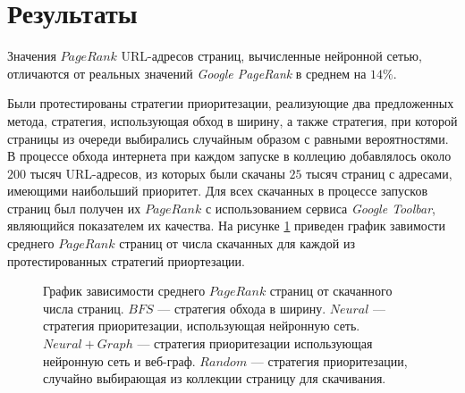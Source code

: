 \section{Результаты}

Значения $PageRank$ URL-адресов страниц, вычисленные нейронной сетью, отличаются от реальных значений \textit{Google PageRank} в среднем на $14\%$.

Были протестированы стратегии приоритезации, реализующие два предложенных метода, стратегия, использующая обход в ширину, а также стратегия, при которой страницы из очереди выбирались случайным образом с равными вероятностями. В процессе обхода интернета при каждом запуске в коллецию добавлялось около $200$ тысяч URL-адресов, из которых были скачаны $25$ тысяч страниц с адресами, имеющими наибольший приоритет. Для всех скачанных в процессе запусков страниц был получен их $PageRank$ с использованием сервиса \textit{Google Toolbar}, являющийся показателем их качества. На рисунке \ref{graphic} приведен график завимости среднего $PageRank$ страниц от числа скачанных для каждой из протестированных стратегий приортезации.

\begin{figure}[h!]
\caption{График зависимости среднего $PageRank$ страниц от скачанного числа страниц. $BFS$ --- стратегия обхода в ширину. $Neural$ --- стратегия приоритезации, использующая нейронную сеть. $Neural + Graph$ --- стратегия приоритезации использующая нейронную сеть и веб-граф. $Random$ --- стратегия приоритезации, случайно выбирающая из коллекции страницу для скачивания.}
\label{graphic}
\end{figure}

